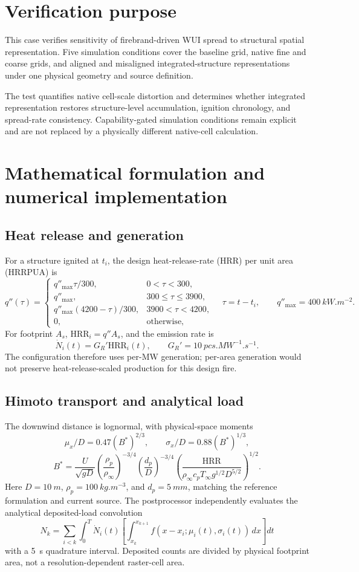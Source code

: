 \section{Verification purpose}

This case verifies sensitivity of firebrand-driven WUI spread to structural spatial representation. Five simulation conditions cover the baseline grid, native fine and coarse grids, and aligned and misaligned integrated-structure representations under one physical geometry and source definition.

The test quantifies native cell-scale distortion and determines whether integrated representation restores structure-level accumulation, ignition chronology, and spread-rate consistency. Capability-gated simulation conditions remain explicit and are not replaced by a physically different native-cell calculation.

\section{Mathematical formulation and numerical implementation}

\subsection{Heat release and generation}

For a structure ignited at \(t_i\), the design heat-release-rate (HRR) per unit area (HRRPUA) is
\[
q''(\tau)=
\begin{cases}
q''_{\max}\tau/300,&0<\tau<300,\\
q''_{\max},&300\le\tau\le3900,\\
q''_{\max}(4200-\tau)/300,&3900<\tau<4200,\\
0,&\text{otherwise},
\end{cases}
\quad \tau=t-t_i,\qquad q''_{\max}=\SI{400}{kW.m^{-2}}.
\]
For footprint \(A_s\), \(\mathrm{HRR}_i=q''A_s\), and the emission rate is
\[
\dot N_i(t)=G_R'\mathrm{HRR}_i(t),\qquad
G_R'=\SI{10}{pcs.MW^{-1}.s^{-1}}.
\]
The configuration therefore uses per-MW generation; per-area generation would
not preserve heat-release-scaled production for this design fire.

\subsection{Himoto transport and analytical load}

The downwind distance is lognormal, with physical-space moments
\[
\mu_x/D=0.47(B^*)^{2/3},\qquad \sigma_x/D=0.88(B^*)^{1/3},
\]
\[
B^*=\frac{U}{\sqrt{gD}}
\left(\frac{\rho_p}{\rho_\infty}\right)^{-3/4}
\left(\frac{d_p}{D}\right)^{-3/4}
\left(\frac{\mathrm{HRR}}
{\rho_\infty c_pT_\infty g^{1/2}D^{5/2}}\right)^{1/2}.
\]
Here \(D=\SI{10}{m}\), \(\rho_p=\SI{100}{kg.m^{-3}}\), and
\(d_p=\SI{5}{mm}\), matching the reference formulation and current source. The postprocessor
independently evaluates the analytical deposited-load convolution
\[
N_k=\sum_{i<k}\int_0^T\dot N_i(t)
\left[\int_{x_k}^{x_{k+1}}
f(x-x_i;\mu_i(t),\sigma_i(t))\,dx\right]dt
\]
with a \SI{5}{s} quadrature interval. Deposited counts are divided by physical
footprint area, not a resolution-dependent raster-cell area.

